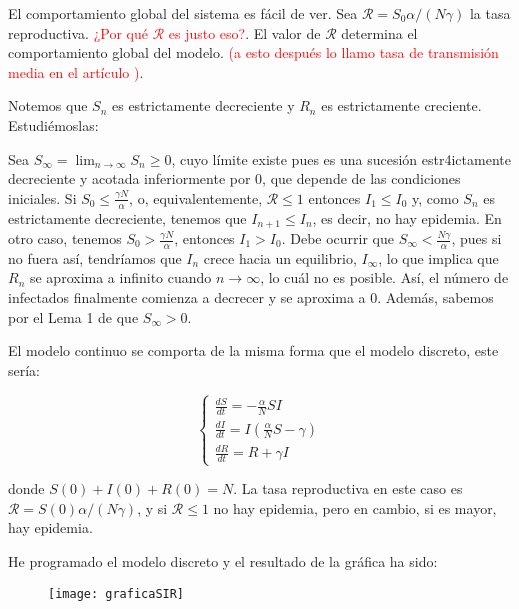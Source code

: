 El comportamiento global del sistema es fácil de ver. Sea $\mathcal{R}=S_0 \alpha/(N\gamma )$ la tasa reproductiva. \textcolor{red}{¿Por qué $\mathcal{R}$ es justo eso?}. El valor de $\mathcal{R}$ determina el comportamiento global del modelo. \textcolor{red}{(a esto después lo llamo tasa de transmisión media en el artículo \cite{demongeotSIEpidemicModel})}. 

Notemos que $S_n$ es estrictamente decreciente y $R_n$ es estrictamente creciente. Estudiémoslas:

Sea $S_\infty=\lim_{n\rightarrow\infty} S_n\geq 0$, cuyo límite existe pues es una sucesión estr4ictamente decreciente y acotada inferiormente por $0$, que depende de las condiciones iniciales. Si $S_0\leq \frac{\gamma N}{\alpha}$, o, equivalentemente, $\mathcal{R}\leq 1$ entonces $I_1\leq I_0$ y, como $S_n$ es estrictamente decreciente, tenemos que $I_{n+1}\leq I_n$, es decir, no hay epidemia. En otro caso, tenemos $S_0> \frac{\gamma N}{\alpha}$, entonces $I_1>I_0$. Debe ocurrir que $S_\infty <\frac{N\gamma}{\alpha}$, pues si no fuera así, tendríamos que $I_n$ crece hacia un equilibrio, $I_\infty$, lo que implica que $R_n$ se aproxima a infinito cuando $n\rightarrow\infty$, lo cuál no es posible. Así, el número de infectados finalmente comienza a decrecer y se aproxima a $0$. Además, sabemos por el Lema 1 de \cite{allenDiscretetimeSISIR1994} que $S_\infty>0$.

El modelo continuo se comporta de la misma forma que el modelo discreto, este sería:

\begin{equation}
\label{eqn: modelo_SIR_continuo}
\begin{cases}
\frac{dS}{dt} = -\frac{\alpha}{N}SI \\
\frac{dI}{dt} = I\left(\frac{\alpha}{N}S-\gamma \right) \\
\frac{dR}{dt} = R+\gamma I
\end{cases}
\end{equation}

donde $S(0)+I(0)+R(0)=N$. La tasa reproductiva en este caso es $\mathcal{R}=S(0)\alpha /(N\gamma )$, y si $\mathcal{R}\leq 1$  no hay epidemia, pero en cambio, si es mayor, hay epidemia.

He programado el modelo discreto y el resultado de la gráfica ha sido:

\begin{figure}[H]
\begin{center}
\texttt{[image: graficaSIR]}
\end{center}
\end{figure}





